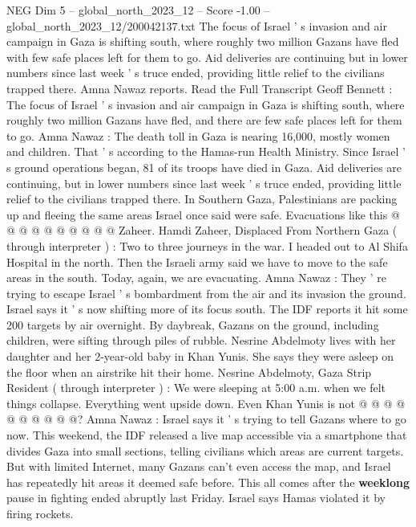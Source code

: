 \begin{textsample}{NEG Dim 5 – global\_north\_2023\_12 – Score -1.00 – global\_north\_2023\_12/200042137.txt}  \label{ex:f5_neg_055}
The focus of Israel ' s invasion and air campaign in Gaza is shifting south, where roughly two million Gazans have fled with few safe places left for them to go.
Aid deliveries are continuing but in lower numbers since last week ' s truce ended, providing little relief to the civilians trapped there.
Amna Nawaz reports.
Read the Full Transcript Geoff Bennett : The focus of Israel ' s invasion and air campaign in Gaza is shifting south, where roughly two million Gazans have fled, and there are few safe places left for them to go.
Amna Nawaz : The death toll in Gaza is nearing 16,000, mostly women and children.
That ' s according to the Hamas-run Health Ministry.
Since Israel ' s ground operations began, 81 of its troops have died in Gaza.
Aid deliveries are continuing, but in lower numbers since last week ' s truce ended, providing little relief to the civilians trapped there.
In Southern Gaza, Palestinians are packing up and fleeing the same areas Israel once said were safe.
Evacuations like this @ @ @ @ @ @ @ @ @ @ Zaheer.
Hamdi Zaheer, Displaced From Northern Gaza ( through interpreter ) : Two to three journeys in the war.
I headed out to Al Shifa Hospital in the north.
Then the Israeli army said we have to move to the safe areas in the south.
Today, again, we are evacuating.
Amna Nawaz : They ' re trying to escape Israel ' s bombardment from the air and its invasion the ground.
Israel says it ' s now shifting more of its focus south.
The IDF reports it hit some 200 targets by air overnight.
By daybreak, Gazans on the ground, including children, were sifting through piles of rubble.
Nesrine Abdelmoty lives with her daughter and her 2-year-old baby in Khan Yunis.
She says they were asleep on the floor when an airstrike hit their home.
Nesrine Abdelmoty, Gaza Strip Resident ( through interpreter ) : We were sleeping at 5:00 a.m. when we felt things collapse.
Everything went upside down.
Even Khan Yunis is not @ @ @ @ @ @ @ @ @ @?
Amna Nawaz : Israel says it ' s trying to tell Gazans where to go now.
This weekend, the IDF released a live map accessible via a smartphone that divides Gaza into small sections, telling civilians which areas are current targets.
But with limited Internet, many Gazans can't even access the map, and Israel has repeatedly hit areas it deemed safe before.
This all comes after the \textbf{weeklong} pause in fighting ended abruptly last Friday.
Israel says Hamas violated it by firing rockets.

\end{textsample}
